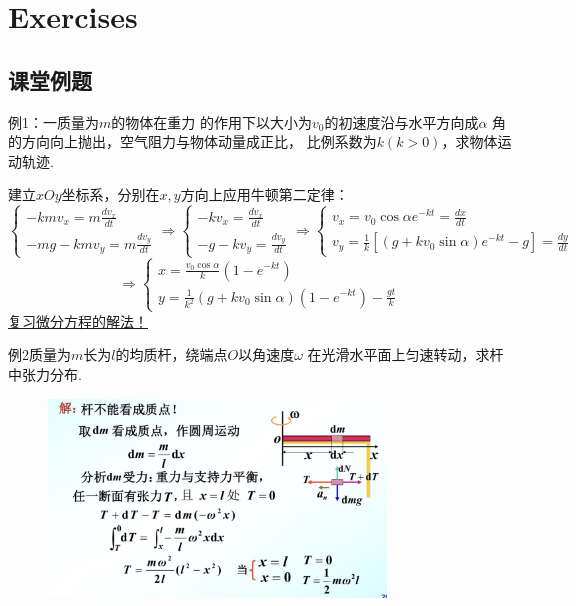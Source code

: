 \documentclass[10pt,a4paper]{article}
\begin{document}
\section{Exercises}
\subsection{课堂例题}
例1：一质量为$m$的物体在重力 的作用下以大小为$v_0$的初速度沿与水平方向成$\alpha$
角的方向向上抛出，空气阻力与物体动量成正比，
比例系数为$k(k>0)$，求物体运动轨迹.

建立$xOy$坐标系，分别在$x,y$方向上应用牛顿第二定律：
\[
\begin{cases}
-kmv_x=m\frac{dv_x}{dt}\\
-mg-kmv_y=m\frac{dv_y}{dt}
\end{cases}\Rightarrow
\begin{cases}
-kv_x=\frac{dv_x}{dt}\\
-g-kv_y=\frac{dv_y}{dt}
\end{cases}\Rightarrow
\begin{cases}
v_x=v_0\cos\alpha e^{-kt}=\frac{dx}{dt}\\
v_y=\frac{1}{k}[(g+kv_0\sin\alpha)e^{-kt}-g]=\frac{dy}{dt}
\end{cases}\]
\[
\Rightarrow
\begin{cases}
x=\frac{v_0\cos\alpha}{k}(1-e^{-kt})\\
y=\frac{1}{k^2}(g+kv_0\sin\alpha)(1-e^{-kt})-\frac{gt}{k}
\end{cases}
\]\underline{复习微分方程的解法！}

例2质量为$m$长为$l$的均质杆，绕端点$O$以角速度$\omega$
在光滑水平面上匀速转动，求杆中张力分布.
\begin{figure}[h]
\centering
\includegraphics[width=0.8\textwidth]{eg2.jpg}
\end{figure}
\end{document}
